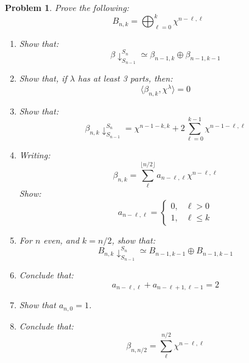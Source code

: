 \documentclass{article}
\theoremstyle{normal}
\newtheorem{problem}{Problem}
\theoremstyle{thmit}
\begin{document}
\begin{problem}
    Prove the following:
    \begin{equation}
        B_{n,k}=\bigoplus_{\ell=0}^{k}\chi^{n-\ell,\ell}
    \end{equation}
    \begin{enumerate}
        \item
            Show that:
            \begin{equation}
                \beta\downarrow_{S_{n-1}}^{S_{n}}\simeq\beta_{n-1,k}\oplus\beta_{n-1,k-1}
            \end{equation}
        \item
            Show that, if $\lambda$ has at least 3 parts, then:
            \begin{equation}
                \langle{\beta_{n,k},\chi^{\lambda}}\rangle=0
            \end{equation}
        \item
            Show that:
            \begin{equation}
                \beta_{n,k}\downarrow_{S_{n-1}}^{S_{n}}
                =\chi^{n-1-k,k}+2\sum_{\ell=0}^{k-1}\chi^{n-1-\ell,\ell}
            \end{equation}
        \item
            Writing:
            \begin{equation}
                \beta_{n,k}=\sum_{\ell}^{\lfloor{n/2\rfloor}}a_{n-\ell,\ell}\chi^{n-\ell,\ell}
            \end{equation}
            Show:
            \begin{equation}
                a_{n-\ell,\ell}=
                \begin{cases}
                    0,&\ell>0\\
                    1,&\ell\leq{k}
                \end{cases}
            \end{equation}
        \item For $n$ even, and $k=n/2$, show that:
            \begin{equation}
                B_{n,k}\downarrow_{S_{n-1}}^{S_{n}}\simeq{B}_{n-1,k-1}\oplus{B}_{n-1,k-1}
            \end{equation}
        \item Conclude that:
            \begin{equation}
                a_{n-\ell,\ell}+a_{n-\ell+1,\ell-1}=2
            \end{equation}
        \item
            Show that $a_{n,0}=1$.
        \item
            Conclude that:
            \begin{equation}
                \beta_{n,n/2}=\sum_{\ell}^{n/2}\chi^{n-\ell,\ell}
            \end{equation}
    \end{enumerate}
\end{problem}
\end{document}
